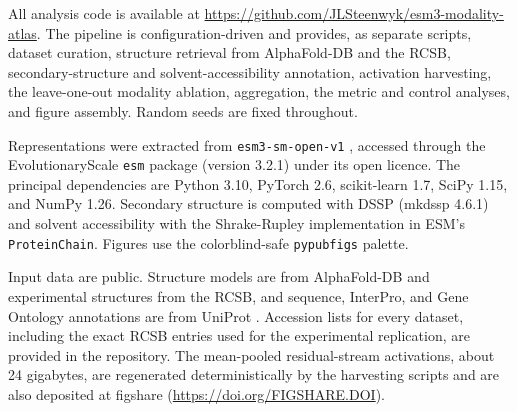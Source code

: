 \documentclass[11pt]{article}
\begin{document}
All analysis code is available at \url{https://github.com/JLSteenwyk/esm3-modality-atlas}. The
pipeline is configuration-driven and provides, as separate scripts, dataset curation,
structure retrieval from AlphaFold-DB and the RCSB, secondary-structure and
solvent-accessibility annotation, activation harvesting, the leave-one-out modality
ablation, aggregation, the metric and control analyses, and figure assembly. Random
seeds are fixed throughout.

Representations were extracted from \texttt{esm3-sm-open-v1} \cite{hayes2024}, accessed
through the EvolutionaryScale \texttt{esm} package (version 3.2.1) under its open
licence. The principal dependencies are Python 3.10, PyTorch 2.6, scikit-learn 1.7,
SciPy 1.15, and NumPy 1.26. Secondary structure is computed with DSSP (mkdssp 4.6.1)
\cite{kabsch1983} and solvent accessibility with the Shrake-Rupley implementation
\cite{shrake1973} in ESM's \texttt{ProteinChain}. Figures use the colorblind-safe
\texttt{pypubfigs} palette.

Input data are public. Structure models are from AlphaFold-DB \cite{varadi2022} and
experimental structures from the RCSB, and sequence, InterPro, and Gene Ontology
annotations are from UniProt \cite{uniprot2023,paysanlafosse2023}. Accession lists for
every dataset, including the exact RCSB entries used for the experimental replication,
are provided in the repository. The mean-pooled residual-stream activations, about 24
gigabytes, are regenerated deterministically by the harvesting scripts and are also
deposited at figshare (\url{https://doi.org/FIGSHARE.DOI}).



\end{document}
